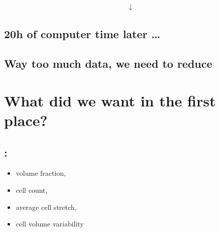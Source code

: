 \documentclass[letterpaper,10pt,english]{sphinxmanual}
\begin{document}
\begin{equation*}
\begin{split}\downarrow\end{split}
\end{equation*}

\subsection{20h of computer time later …}
\label{\detokenize{04-BasicSegmentation:center-20h-of-computer-time-later-center}}





\subsection{Way too much data, we need to reduce}
\label{\detokenize{04-BasicSegmentation:way-too-much-data-we-need-to-reduce}}



\section{What did we want in the first place?}
\label{\detokenize{04-BasicSegmentation:what-did-we-want-in-the-first-place}}

\subsection{:}
\label{\detokenize{04-BasicSegmentation:single-numbers}}\begin{itemize}
\item {} 
\sphinxAtStartPar
volume fraction,

\item {} 
\sphinxAtStartPar
cell count,

\item {} 
\sphinxAtStartPar
average cell stretch,

\item {} 
\sphinxAtStartPar
cell volume variability

\end{itemize}
\end{document}
